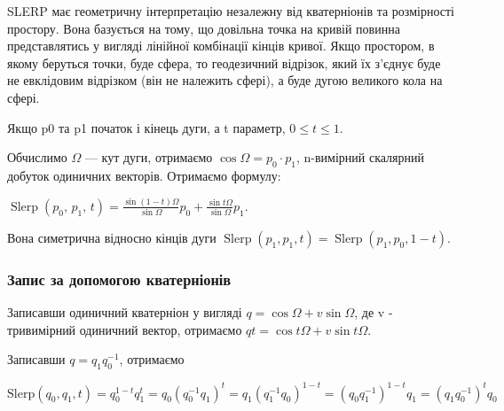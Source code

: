 SLERP має геометричну інтерпретацію незалежну від кватерніонів та розмірності простору. Вона базується на тому, що довільна точка на кривій повинна представлятись у вигляді лінійної комбінації кінців кривої. Якщо простором, в якому беруться точки, буде сфера, то геодезичний відрізок, який їх з'єднує буде не евклідовим відрізком (він не належить сфері), а буде дугою великого кола на сфері.

Якщо p0 та p1 початок і кінець дуги, а t параметр, $0 \le t \le 1$.

Обчислимо $\Omega$ — кут дуги, отримаємо $\cos{\Omega} = p_0 \cdot p_1$, n-вимірний скалярний добуток одиничних векторів. Отримаємо формулу:
\begin{center}
  $\operatorname{Slerp}(p_0, \, p_1, \, t) = \frac{\sin {(1-t)\Omega}}{\sin \Omega} p_0 + \frac{\sin t\Omega}{\sin \Omega} p_1.$
\end{center}

Вона симетрична відносно кінців дуги
$\operatorname{Slerp}(p_1,p_1,t) = \operatorname{Slerp}(p_1,p_0,1-t)$.

\subsubsection{Запис за допомогою кватерніонів}

Записавши одиничний кватерніон у вигляді $q = \cos{\Omega} + v\sin{\Omega}$, де v - тривимірний одиничний вектор, отримаємо $qt = \cos{t\Omega} + v\sin{t\Omega}$.

Записавши $q = q_1q_0^{-1}$, отримаємо

$\mathrm{Slerp}(q_0, q_1, t) = q_0^{1-t} q_1^t
=q_0 (q_0^{-1} q_1)^t
=q_1 (q_1^{-1} q_0)^{1-t}
=(q_0 q_1^{-1})^{1-t} q_1
=(q_1 q_0^{-1})^t q_0
$